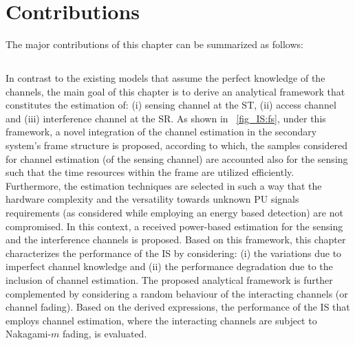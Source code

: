 \section{Contributions}
The major contributions of this chapter can be summarized as follows:
\subsection{}
In contrast to the existing models that assume the perfect knowledge of the channels, the main goal of this chapter is to derive an analytical framework that constitutes the estimation of: (i) sensing channel at the ST, (ii) access channel and (iii) interference channel at the SR. As shown in \figurename~\ref{fig_IS:fs}, under this framework, a novel integration of the channel estimation in the secondary system's frame structure is proposed, according to which, the samples considered for channel estimation (of the sensing channel) are accounted also for the sensing such that the time resources within the frame are utilized efficiently. Furthermore, the estimation techniques are selected in such a way that the hardware complexity and the versatility towards unknown PU signals requirements (as considered while employing an energy based detection) are not compromised. In this context, a received power-based estimation for the sensing and the interference channels is proposed. Based on this framework, this chapter characterizes the performance of the IS by considering: (i) the variations due to imperfect channel knowledge and (ii) the performance degradation due to the inclusion of channel estimation. The proposed analytical framework is further complemented by considering a random behaviour of the interacting channels (or channel fading). Based on the derived expressions, the performance of the IS that employs channel estimation, where the interacting channels are subject to Nakagami-$m$ fading, is evaluated.


